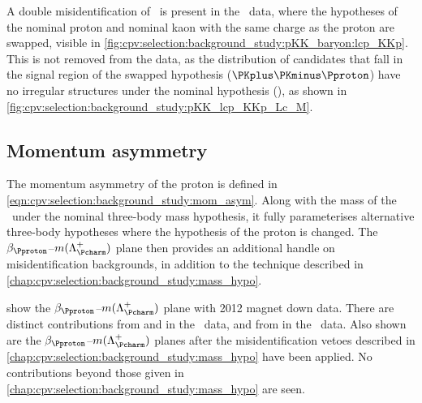 A double misidentification of \pKK\ is present in the \pKK\ data, where the
hypotheses of the nominal proton and nominal kaon with the same charge as the
proton are swapped, visible in
\cref{fig:cpv:selection:background_study:pKK_baryon:lcp_KKp}.
This is not removed from the data, as the distribution of candidates that fall
in the signal region of the swapped hypothesis ($\PKplus\PKminus\Pproton$) have
no irregular structures under the nominal hypothesis (\pKK), as shown in
\cref{fig:cpv:selection:background_study:pKK_lcp_KKp_Lc_M}.

\subsection{Momentum asymmetry}
\label{chap:cpv:selection:background_study:mom_asym}

The momentum asymmetry of the proton is defined in
\cref{eqn:cpv:selection:background_study:mom_asym}.
Along with the mass of the \PLambdac\ under the nominal three-body mass
hypothesis, it fully parameterises alternative three-body hypotheses where the
hypothesis of the proton is changed.
The $\beta_{\Pproton}$--$m(\PLambdac)$ plane then provides an additional handle
on misidentification backgrounds, in addition to the technique described in
\cref{chap:cpv:selection:background_study:mass_hypo}.

show the $\beta_{\Pproton}$--$m(\PLambdac)$ plane with 2012 magnet down data.
There are distinct contributions from \decay{\PDplus}{\PKplus\PKminus\Ppiplus}
and \decay{\PDsplus}{\PKplus\PKminus\Ppiplus} in the \pKK\ data, and from
\decay{\PDsplus}{\PKplus\Ppiminus\Ppiplus} in the \ppipi\ data.
Also shown are the $\beta_{\Pproton}$--$m(\PLambdac)$ planes after the
misidentification vetoes described in
\cref{chap:cpv:selection:background_study:mass_hypo} have been applied.
No contributions beyond those given in
\cref{chap:cpv:selection:background_study:mass_hypo} are seen.

